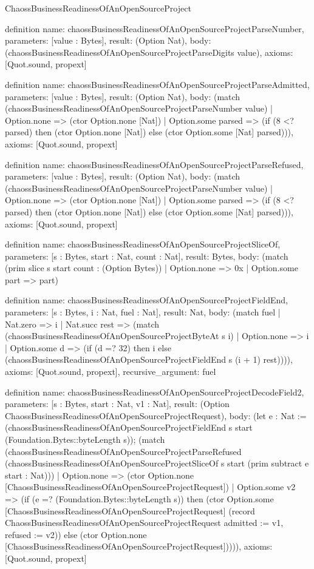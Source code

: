 \begin{lexlean}{ChaossBusinessReadinessOfAnOpenSourceProject}
\begin{semanticmodule}
definition{
  name: chaossBusinessReadinessOfAnOpenSourceProjectParseNumber,
  parameters: [value : Bytes],
  result: (Option Nat),
  body: (chaossBusinessReadinessOfAnOpenSourceProjectParseDigits value),
  axioms: [Quot.sound, propext]
}

definition{
  name: chaossBusinessReadinessOfAnOpenSourceProjectParseAdmitted,
  parameters: [value : Bytes],
  result: (Option Nat),
  body: (match (chaossBusinessReadinessOfAnOpenSourceProjectParseNumber value)
    | Option.none => (ctor Option.none [Nat])
    | Option.some parsed => (if (8 <? parsed) then (ctor Option.none [Nat]) else (ctor Option.some [Nat] parsed))),
  axioms: [Quot.sound, propext]
}

definition{
  name: chaossBusinessReadinessOfAnOpenSourceProjectParseRefused,
  parameters: [value : Bytes],
  result: (Option Nat),
  body: (match (chaossBusinessReadinessOfAnOpenSourceProjectParseNumber value)
    | Option.none => (ctor Option.none [Nat])
    | Option.some parsed => (if (8 <? parsed) then (ctor Option.none [Nat]) else (ctor Option.some [Nat] parsed))),
  axioms: [Quot.sound, propext]
}

definition{
  name: chaossBusinessReadinessOfAnOpenSourceProjectSliceOf,
  parameters: [s : Bytes, start : Nat, count : Nat],
  result: Bytes,
  body: (match (prim slice s start count : (Option Bytes))
    | Option.none => 0x
    | Option.some part => part)
}

definition{
  name: chaossBusinessReadinessOfAnOpenSourceProjectFieldEnd,
  parameters: [s : Bytes, i : Nat, fuel : Nat],
  result: Nat,
  body: (match fuel
    | Nat.zero => i
    | Nat.succ rest => (match (chaossBusinessReadinessOfAnOpenSourceProjectByteAt s i)
      | Option.none => i
      | Option.some d => (if (d =? 32) then i else (chaossBusinessReadinessOfAnOpenSourceProjectFieldEnd s (i + 1) rest)))),
  axioms: [Quot.sound, propext],
  recursive_argument: fuel
}

definition{
  name: chaossBusinessReadinessOfAnOpenSourceProjectDecodeField2,
  parameters: [s : Bytes, start : Nat, v1 : Nat],
  result: (Option ChaossBusinessReadinessOfAnOpenSourceProjectRequest),
  body: (let e : Nat := (chaossBusinessReadinessOfAnOpenSourceProjectFieldEnd s start (Foundation.Bytes::byteLength s)); (match (chaossBusinessReadinessOfAnOpenSourceProjectParseRefused (chaossBusinessReadinessOfAnOpenSourceProjectSliceOf s start (prim subtract e start : Nat)))
    | Option.none => (ctor Option.none [ChaossBusinessReadinessOfAnOpenSourceProjectRequest])
    | Option.some v2 => (if (e =? (Foundation.Bytes::byteLength s)) then (ctor Option.some [ChaossBusinessReadinessOfAnOpenSourceProjectRequest] (record ChaossBusinessReadinessOfAnOpenSourceProjectRequest {admitted := v1, refused := v2})) else (ctor Option.none [ChaossBusinessReadinessOfAnOpenSourceProjectRequest])))),
  axioms: [Quot.sound, propext]
}


\end{semanticmodule}
\end{lexlean}
